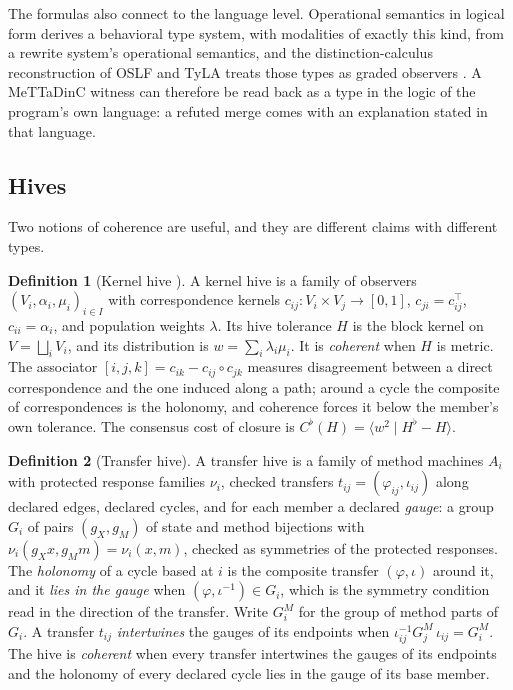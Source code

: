 \documentclass[11pt]{article}
\newcommand{\br}[2]{\langle #1 \mid #2 \rangle}
\theoremstyle{definition}
\newtheorem{definition}{Definition}[section]
\theoremstyle{plain}
\begin{document}
The formulas also connect to the language level. Operational semantics in logical form derives a
behavioral type system, with modalities of exactly this kind, from a rewrite system's operational
semantics, and the distinction-calculus reconstruction of OSLF and TyLA treats those types as graded
observers \cite{oslf}. A MeTTaDinC witness can therefore be read back as a type in the logic of the
program's own language: a refuted merge comes with an explanation stated in that language.

\subsection{Hives}\label{sec:hives}

Two notions of coherence are useful, and they are different claims with different types.

\begin{definition}[Kernel hive {\cite{dclosure}}]\label{def:kernelhive}
A kernel hive is a family of observers $(V_i,\alpha_i,\mu_i)_{i\in I}$ with correspondence kernels
$c_{ij}:V_i\times V_j\to[0,1]$, $c_{ji}=c_{ij}^{\top}$, $c_{ii}=\alpha_i$, and population weights
$\lambda$. Its hive tolerance $H$ is the block kernel on $V=\bigsqcup_iV_i$, and its distribution
is $w=\sum_i\lambda_i\mu_i$. It is \emph{coherent} when $H$ is metric. The associator
$[i,j,k]=c_{ik}-c_{ij}\circ c_{jk}$ measures disagreement between a direct correspondence and the one
induced along a path; around a cycle the composite of correspondences is the holonomy, and
coherence forces it below the member's own tolerance. The consensus cost of closure is
$C^\flat(H)=\br{w^2}{H^\flat-H}$.
\end{definition}

\begin{definition}[Transfer hive]\label{def:transferhive}
A transfer hive is a family of method machines $A_i$ with protected response families $\nu_i$,
checked transfers $t_{ij}=(\varphi_{ij},\iota_{ij})$ along declared edges, declared cycles, and for
each member a declared \emph{gauge}: a group $G_i$ of pairs $(g_X,g_M)$ of state and method
bijections with $\nu_i(g_Xx,g_Mm)=\nu_i(x,m)$, checked as symmetries of the protected responses.
The \emph{holonomy} of a cycle based at $i$ is the composite transfer $(\varphi,\iota)$ around it,
and it \emph{lies in the gauge} when $(\varphi,\iota^{-1})\in G_i$, which is the symmetry condition
read in the direction of the transfer. Write $G^M_i$ for the group of method parts of $G_i$. A transfer $t_{ij}$ \emph{intertwines} the
gauges of its endpoints when $\iota_{ij}^{-1}G^M_j\,\iota_{ij}=G^M_i$. The hive is \emph{coherent}
when every transfer intertwines the gauges of its endpoints and the holonomy of every declared cycle
lies in the gauge of its base member.
\end{definition}
\end{document}
